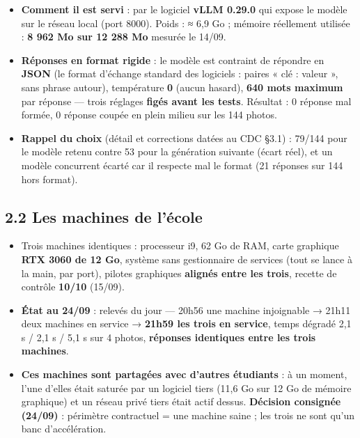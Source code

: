 \documentclass[11pt,a4paper]{article}
\begin{document}
\begin{itemize}  \item \textbf{Comment il est servi} : par le logiciel \textbf{vLLM 0.29.0} qui expose le modèle sur le réseau local (port 8000). Poids : ≈ 6,9 Go ; mémoire réellement utilisée : \textbf{8 962 Mo sur 12 288 Mo} mesurée le 14/09.
\end{itemize}

\begin{itemize}  \item \textbf{Réponses en format rigide} : le modèle est contraint de répondre en \textbf{JSON} (le format d'échange standard des logiciels : paires « clé : valeur », sans phrase autour), température \textbf{0} (aucun hasard), \textbf{640 mots maximum} par réponse — trois réglages \textbf{figés avant les tests}. Résultat : 0 réponse mal formée, 0 réponse coupée en plein milieu sur les 144 photos.
\end{itemize}

\begin{itemize}  \item \textbf{Rappel du choix} (détail et corrections datées au CDC §3.1) : 79/144 pour le modèle retenu contre 53 pour la génération suivante (écart réel), et un modèle concurrent écarté car il respecte mal le format (21 réponses sur 144 hors format).
\end{itemize}

\subsection*{2.2 Les machines de l'école}
\begin{itemize}  \item Trois machines identiques : processeur i9, 62 Go de RAM, carte graphique \textbf{RTX 3060 de 12 Go}, système sans gestionnaire de services (tout se lance à la main, par port), pilotes graphiques \textbf{alignés entre les trois}, recette de contrôle \textbf{10/10} (15/09).
\end{itemize}

\begin{itemize}  \item \textbf{État au 24/09} : relevés du jour — 20h56 une machine injoignable → 21h11 deux machines en service → \textbf{21h59 les trois en service}, temps dégradé 2,1 s / 2,1 s / 5,1 s sur 4 photos, \textbf{réponses identiques entre les trois machines}.
\end{itemize}

\begin{itemize}  \item \textbf{Ces machines sont partagées avec d'autres étudiants} : à un moment, l'une d'elles était saturée par un logiciel tiers (11,6 Go sur 12 Go de mémoire graphique) et un réseau privé tiers était actif dessus. \textbf{Décision consignée (24/09)} : périmètre contractuel = une machine saine ; les trois ne sont qu'un banc d'accélération.
\end{itemize}
\end{document}
